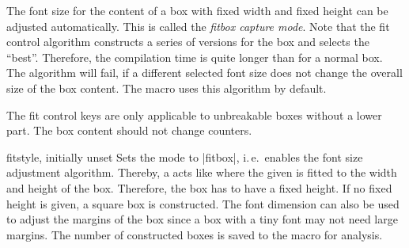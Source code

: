 The font size for the content of a box with fixed width and fixed height
can be adjusted automatically. This is called the \emph{fitbox capture mode}.
Note that the fit control algorithm
constructs a series of versions for the box and selects the \enquote{best}.
Therefore, the compilation time is quite longer than for a normal box.
The algorithm will fail, if a different selected font size does not change the
overall size of the box content.
The  macro uses this algorithm by default.


\medskip
\begin{marker}
  The fit control keys are only applicable to unbreakable boxes without
  a lower part.
  The box content should not change counters.
\end{marker}
\medskip

\enlargethispage*{5mm}
\begin{docTcbKey}{fit}{}{style, initially unset}
  Sets the  mode to |fitbox|, i.\,e.\ enables the
  font size adjustment algorithm. Thereby, a  acts
  like  where the given  is fitted to
  the width and height of the box. Therefore, the box has to have a fixed height.
  If no fixed height is given, a square box is constructed.
  The font dimension  can also be used to adjust
  the margins of the box since a box with a tiny font may not need large
  margins. The number of constructed boxes is saved to the macro 
  for analysis.

\end{docTcbKey}


